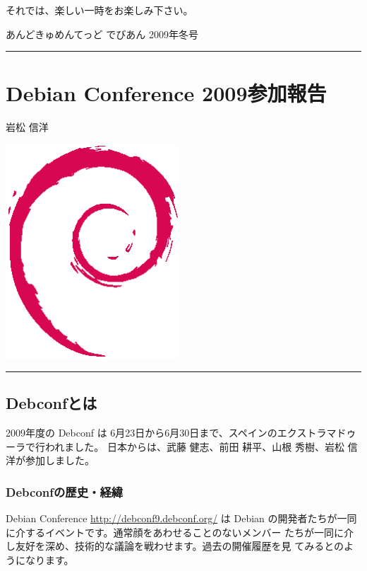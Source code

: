 \documentclass[mingoth,a4paper]{jsarticle}
\renewcommand{\dancersection}[2]{%
\newpage
あんどきゅめんてっど でびあん 2009年冬号
%
\vspace{0.1mm}\\
{\color{dancerlightblue}\rule{\hsize}{2mm}}

%
%
\begin{minipage}[t]{0.6\hsize}
\color{dancerdarkblue}
\vspace{1cm}
\section{#1}
\hfill{}#2\\
\end{minipage}
\begin{minipage}[t]{0.4\hsize}
\vspace{-2cm}
\hfill{}\includegraphics[height=8cm]{image200502/openlogo-nd.eps}\\
\vspace{-5cm}
\end{minipage}
%
%
{\color{dancerdarkblue}\rule{0.74\hsize}{2mm}}
%
\vspace{2cm}
}
\begin{document}
 それでは、楽しい一時をお楽しみ下さい。

%  
%  
%  
%  
%  
%  
%  
%  


\dancersection{Debian Conference 2009参加報告}{岩松 信洋}
\label{sec:debconfreportsummary}

\subsection{Debconfとは}

2009年度の Debconf は 6月23日から6月30日まで、スペインのエクストラマドゥーラで行われました。
日本からは、武藤 健志、前田 耕平、山根 秀樹、岩松 信洋が参加しました。

\subsubsection{Debconfの歴史・経緯}

Debian Conference \url{http://debconf9.debconf.org/} は Debian 
の開発者たちが一同に介するイベントです。通常顔をあわせることのないメンバー
たちが一同に介し友好を深め、技術的な議論を戦わせます。過去の開催履歴を見
てみるとのようになります。
\end{document}
